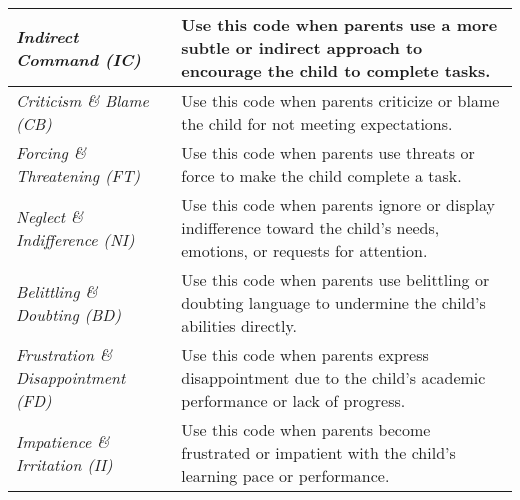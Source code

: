 \begin{table}[h]
\begin{tabular}{p{} p{}}
\textit{Indirect Command (IC)} & Use this code when parents use a more subtle or indirect approach to encourage the child to complete tasks. \\ \hline
\textit{Criticism \& Blame (CB)} & Use this code when parents criticize or blame the child for not meeting expectations. \\ \hline
\textit{Forcing \& Threatening (FT)} & Use this code when parents use threats or force to make the child complete a task. \\ \hline
\textit{Neglect \& Indifference (NI)} & Use this code when parents ignore or display indifference toward the child's needs, emotions, or requests for attention. \\ \hline
\textit{Belittling \& Doubting (BD)} & Use this code when parents use belittling or doubting language to undermine the child's abilities directly. \\ \hline
\textit{Frustration \& Disappointment (FD)} & Use this code when parents express disappointment due to the child's academic performance or lack of progress. \\ \hline
\textit{Impatience \& Irritation (II)} & Use this code when parents become frustrated or impatient with the child's learning pace or performance. \\ \bottomrule
\end{tabular}
\end{table}

